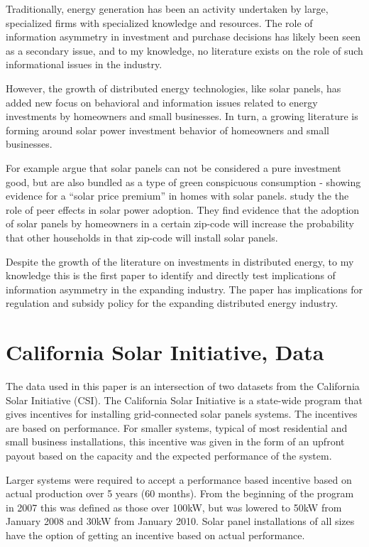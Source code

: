 \documentclass[12pt]{article}
\begin{document}
Traditionally, energy generation has been an activity undertaken by large, specialized firms with specialized knowledge and resources. The role of information asymmetry in investment and purchase decisions has likely been seen as a secondary issue, and to my knowledge, no literature exists on the role of such informational issues in the industry.

However, the growth of distributed energy technologies, like solar panels, has added new focus on behavioral and information issues related to energy investments by homeowners and small businesses. In turn, a growing literature is forming around solar power investment behavior of homeowners and small businesses.

For example \citet{dastrup_understanding_2012} argue that solar panels can not be considered a pure investment good, but are also bundled as a type of green conspicuous consumption - showing evidence for a ``solar price premium'' in homes with solar panels. \citet{bollinger_peer_2012} study the the role of peer effects in solar power adoption. They find evidence that the adoption of solar panels by homeowners in a certain zip-code will increase the probability that other households in that zip-code will install solar panels.

Despite the growth of the literature on investments in distributed energy, to my knowledge this is the first paper to identify and directly test implications of information asymmetry in the expanding industry. The paper has implications for regulation and subsidy policy for the expanding distributed energy industry.

\section{California Solar Initiative, Data}

The data used in this paper is an intersection of two datasets from the California Solar Initiative (CSI). The California Solar Initiative is a state-wide program that gives incentives for installing grid-connected solar panels systems. The incentives are based on performance. For smaller systems, typical of most residential and small business installations, this incentive was given in the form of an upfront payout based on the capacity and the expected performance of the system.

Larger systems were required to accept a performance based incentive based on actual production over 5 years (60 months). From the beginning of the program in 2007 this was defined as those over 100kW, but was lowered to 50kW from January 2008 and 30kW from January 2010. Solar panel installations of all sizes have the option of getting an incentive based on actual performance.
\end{document}
